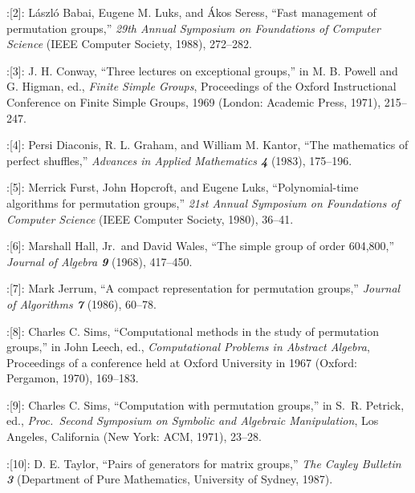 \medskip
\disleft 20pt:[2]:
L\'aszl\'o Babai, Eugene M. Luks, and \'Akos Seress,
``Fast management of permutation groups,''
{\sl 29th Annual Symposium on Foundations of Computer Science\/}
(IEEE Computer Society, 1988), 272--282.

\medskip
\disleft 20pt:[3]:
J. H. Conway,
``Three lectures on exceptional groups,''
in M. B. Powell and G. Higman, ed.,
{\sl Finite Simple Groups}, Proceedings of the Oxford Instructional Conference
  on Finite Simple Groups, 1969
(London: Academic Press, 1971), 215--247.

\medskip
\disleft 20pt:[4]:
Persi Diaconis, R. L. Graham, and William M. Kantor,
``The mathematics of perfect shuffles,''
{\sl Advances in Applied Mathematics\/ \bf 4}
(1983), 175--196.

\medskip
\disleft 20pt:[5]:
Merrick Furst, John Hopcroft, and Eugene Luks,
``Polynomial-time algorithms for permutation groups,''
{\sl 21st Annual Symposium on Foundations of Computer Science\/}
(IEEE Computer Society, 1980), 36--41.

\medskip
\disleft 20pt:[6]:
Marshall Hall, Jr.\ and David Wales,
``The simple group of order 604,800,''
{\sl Journal of Algebra\/ \bf 9}
(1968), 417--450.

\medskip
\disleft 20pt:[7]:
Mark Jerrum,
``A compact representation for permutation groups,''
{\sl Journal of Algorithms\/ \bf7}
(1986), 60--78.

\medskip
\disleft 20pt:[8]:
Charles C. Sims,
``Computational methods in the study of permutation groups,''
in John Leech, ed., {\sl Computational Problems in Abstract Algebra},
Proceedings of a conference held at Oxford University in 1967
(Oxford: Pergamon, 1970), 169--183.

\medskip
\disleft 20pt:[9]:
Charles C. Sims,
``Computation with permutation groups,'' in S.~R. Petrick, ed., 
{\sl Proc.\ Second Symposium on Symbolic and Algebraic Manipulation},
Los Angeles, California (New York: ACM, 1971), 23--28.

\medskip
\disleft 20pt:[10]:
D. E. Taylor,
``Pairs of generators for matrix groups,''
{\sl The Cayley Bulletin\/ \bf 3} (Department of Pure Mathematics,
University of Sydney, 1987).


\bye
